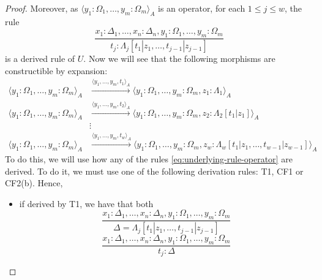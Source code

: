 \begin{proof}
    Moreover, as $\langle y_1 : \Omega_1, \dots, y_m : \Omega_m \rangle_A$
    is an operator, for each $1 \leq j \leq w$, the rule
    \begin{equation}
        \dfrac{
            x_1 : \Delta_1, \dots, x_n : \Delta_n,
            y_1 : \Omega_1, \dots, y_m : \Omega_m
        }{
            t_j : \Lambda_j[t_1 | z_1, \dots, t_{j-1} | z_{j-1}]
        }
        \label{eq:underlying-rule-operator}
    \end{equation}
    is a derived rule of $U$.
    Now we will see that the following morphisms are constructible by expansion:
    \begin{align*} %
        \langle y_1 : \Omega_1, \dots, y_m : \Omega_m \rangle_A
        &\xrightarrow{\langle y_1, \dots, y_m, t_1 \rangle_A}
        \langle y_1 : \Omega_1, \dots, y_m : \Omega_m, z_1 : \Lambda_1 \rangle_A \\
        \langle y_1 : \Omega_1, \dots, y_m : \Omega_m \rangle_A
        &\xrightarrow{\langle y_1, \dots, y_m, t_2 \rangle_A}
        \langle y_1 : \Omega_1, \dots, y_m : \Omega_m, z_2 : \Lambda_2[t_1 | z_1] \rangle_A \\
        &\vdots \\
        \langle y_1 : \Omega_1, \dots, y_m : \Omega_m \rangle_A
        &\xrightarrow{\langle y_1, \dots, y_m, t_w \rangle_A}
        \langle y_1 : \Omega_1, \dots, y_m : \Omega_m, z_w : \Lambda_w[t_1 | z_1, \dots, t_{w-1} | z_{w-1}] \rangle_A 
    \end{align*}
    To do this, we will use how any of the rules \eqref{eq:underlying-rule-operator}
    are derived.
    To do it, we must use one of the following derivation rules: T1, CF1 or CF2(b).
    Hence,
    \begin{itemize}
        \item if derived by T1, we have that both 
            \begin{equation*}
                \dfrac{
                    x_1 : \Delta_1, \dots, x_n : \Delta_n,
                    y_1 : \Omega_1, \dots, y_m : \Omega_m
                }{
                    \Delta = \Lambda_j[t_1 | z_1, \dots, t_{j-1} | z_{j-1}]
                }
            \end{equation*}
            \begin{equation*}
                \dfrac{
                    x_1 : \Delta_1, \dots, x_n : \Delta_n,
                    y_1 : \Omega_1, \dots, y_m : \Omega_m
                }{
                    t_j : \Delta
                }
            \end{equation*}

\end{itemize}
\end{proof}
